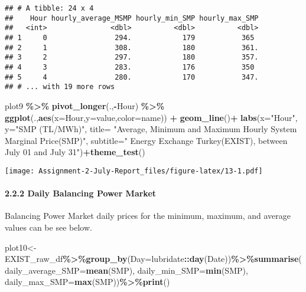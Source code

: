 \documentclass[
]{article}
\newenvironment{Shaded}{\begin{snugshade}}{\end{snugshade}}
\newcommand{\DataTypeTok}[1]{\textcolor[rgb]{0.13,0.29,0.53}{#1}}
\newcommand{\KeywordTok}[1]{\textcolor[rgb]{0.13,0.29,0.53}{\textbf{#1}}}
\newcommand{\NormalTok}[1]{#1}
\newcommand{\OperatorTok}[1]{\textcolor[rgb]{0.81,0.36,0.00}{\textbf{#1}}}
\newcommand{\StringTok}[1]{\textcolor[rgb]{0.31,0.60,0.02}{#1}}
\begin{document}
\begin{verbatim}
## # A tibble: 24 x 4
##    Hour hourly_average_MSMP hourly_min_SMP hourly_max_SMP
##   <int>               <dbl>          <dbl>          <dbl>
## 1     0                294.            179           365 
## 2     1                308.            180           361.
## 3     2                297.            180           357.
## 4     3                283.            176           350 
## 5     4                280.            170           347.
## # ... with 19 more rows
\end{verbatim}

\begin{Shaded}
\begin{Highlighting}[]
\NormalTok{plot9 }\OperatorTok{\%\textgreater{}\%}\StringTok{ }\KeywordTok{pivot\_longer}\NormalTok{(.,}\OperatorTok{{-}}\NormalTok{Hour) }\OperatorTok{\%\textgreater{}\%}\StringTok{ }\KeywordTok{ggplot}\NormalTok{(.,}\KeywordTok{aes}\NormalTok{(}\DataTypeTok{x=}\NormalTok{Hour,}\DataTypeTok{y=}\NormalTok{value,}\DataTypeTok{color=}\NormalTok{name)) }\OperatorTok{+}\StringTok{ }\KeywordTok{geom\_line}\NormalTok{()}\OperatorTok{+}
\StringTok{      }\KeywordTok{labs}\NormalTok{(}\DataTypeTok{x=}\StringTok{"Hour"}\NormalTok{, }\DataTypeTok{y=}\StringTok{"SMP (TL/MWh)"}\NormalTok{, }
           \DataTypeTok{title=}  \StringTok{"Average, Minimum and Maximum Hourly System Marginal Price(SMP)"}\NormalTok{,}
           \DataTypeTok{subtitle=}\StringTok{" Energy Exchange Turkey(EXIST), between July 01 and July 31"}\NormalTok{)}\OperatorTok{+}\KeywordTok{theme\_test}\NormalTok{()}
\end{Highlighting}
\end{Shaded}

\texttt{[image: Assignment-2-July-Report\_files/figure-latex/13-1.pdf]}

\hypertarget{daily-balancing-power-market}{%
\paragraph{2.2.2 Daily Balancing Power
Market}\label{daily-balancing-power-market}}

Balancing Power Market daily prices for the minimum, maximum, and
average values can be see below.

\begin{Shaded}
\begin{Highlighting}[]
\NormalTok{plot10\textless{}{-}EXIST\_raw\_df}\OperatorTok{\%\textgreater{}\%}\KeywordTok{group\_by}\NormalTok{(}\DataTypeTok{Day=}\NormalTok{lubridate}\OperatorTok{::}\KeywordTok{day}\NormalTok{(Date))}\OperatorTok{\%\textgreater{}\%}\KeywordTok{summarise}\NormalTok{(}\DataTypeTok{daily\_average\_SMP=}\KeywordTok{mean}\NormalTok{(SMP), }\DataTypeTok{daily\_min\_SMP=}\KeywordTok{min}\NormalTok{(SMP), }\DataTypeTok{daily\_max\_SMP=}\KeywordTok{max}\NormalTok{(SMP))}\OperatorTok{\%\textgreater{}\%}\KeywordTok{print}\NormalTok{()}
\end{Highlighting}
\end{Shaded}
\end{document}
